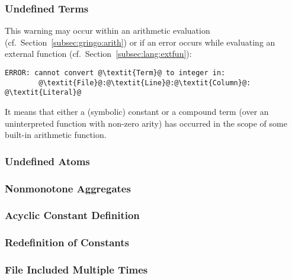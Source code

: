 \subsubsection{Undefined Terms}\label{sec:warn:undefterm}
This warning may occur within an arithmetic evaluation (cf.~Section~\ref{subsec:gringo:arith})
or if an error occurs while evaluating an external function (cf.~Section~\ref{subsec:lang:extfun}):
%
\begin{lstlisting}[numbers=none,escapechar=@]
ERROR: cannot convert @\textit{Term}@ to integer in:
        @\textit{File}@:@\textit{Line}@:@\textit{Column}@: @\textit{Literal}@
\end{lstlisting}
%
It means that either a (symbolic) constant or a compound term
(over an uninterpreted function with non-zero arity)
has occurred in the scope of some built-in arithmetic function.


\subsubsection{Undefined Atoms}\label{sec:warn:undefatm}
\tbf

\subsubsection{Nonmonotone Aggregates}\label{sec:warn:nonmon}
\tbf

\subsubsection{Acyclic Constant Definition}\label{sec:warn:cycdef}
\tbf

\subsubsection{Redefinition of Constants}\label{sec:warn:redef}
\tbf

\subsubsection{File Included Multiple Times}\label{sec:warn:incfile}
\tbf

